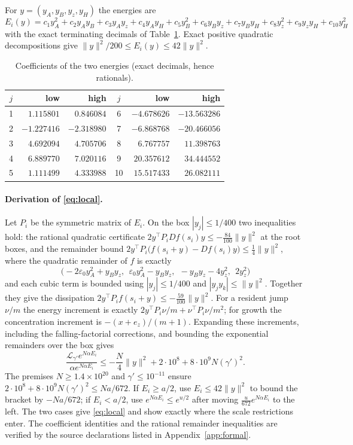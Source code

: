\documentclass[11pt,a4paper]{article}
\theoremstyle{plain}
\theoremstyle{definition}
\theoremstyle{remark}
\newcommand{\eps}{\varepsilon}
\newcommand{\Hs}{H}
\newcommand{\gen}{\mathcal L}
\begin{document}
For $y=(y_A,y_B,y_z,y_\Hs)$ the energies are
\[
E_i(y)=c_1y_A^2+c_2y_Ay_B+c_3y_Ay_z+c_4y_Ay_\Hs+c_5y_B^2+c_6y_By_z+c_7y_By_\Hs+c_8y_z^2+c_9y_zy_\Hs+c_{10}y_\Hs^2
\]
with the exact terminating decimals of Table~\ref{tab:coeff}. Exact positive quadratic decompositions give $\|y\|^2/200\le E_i(y)\le42\|y\|^2$.

\begin{table}[ht]
\centering\small
\caption{Coefficients of the two energies (exact decimals, hence rationals).}
\label{tab:coeff}
\begin{tabular}{crr@{\qquad}crr}
\toprule
$j$ & low & high & $j$ & low & high\\
\midrule
1 & $1.115801$ & $0.846084$ & 6 & $-4.678626$ & $-13.563286$\\
2 & $-1.227416$ & $-2.318980$ & 7 & $-6.868768$ & $-20.466056$\\
3 & $4.692094$ & $4.705706$ & 8 & $6.767757$ & $11.398763$\\
4 & $6.889770$ & $7.020116$ & 9 & $20.357612$ & $34.444552$\\
5 & $1.111499$ & $4.333988$ & 10 & $15.517433$ & $26.082111$\\
\bottomrule
\end{tabular}
\end{table}

\paragraph{Derivation of \eqref{eq:local}.}
Let $P_i$ be the symmetric matrix of $E_i$. On the box $|y_j|\le1/400$ two inequalities hold: the rational quadratic certificate $2y^{\!\top}P_iDf(s_i)y\le-\frac{84}{100}\|y\|^2$ at the root boxes, and the remainder bound $2y^{\!\top}P_i\bigl(f(s_i+y)-Df(s_i)y\bigr)\le\frac14\|y\|^2$, where the quadratic remainder of $f$ is exactly
\[
\bigl(-2\eps_0y_A^2+y_By_z,\ \ \eps_0y_A^2-y_By_z,\ \ -y_By_z-4y_z^2,\ \ 2y_z^2\bigr)
\]
and each cubic term is bounded using $|y_j|\le1/400$ and $|y_jy_k|\le\|y\|^2$. Together they give the dissipation $2y^{\!\top}P_if(s_i+y)\le-\frac{59}{100}\|y\|^2$. For a resident jump $\nu/m$ the energy increment is exactly $2y^{\!\top}P_i\nu/m+\nu^{\!\top}P_i\nu/m^2$; for growth the concentration increment is $-(x+e_z)/(m+1)$. Expanding these increments, including the falling-factorial corrections, and bounding the exponential remainders over the box gives
\[
\frac{\gen_{\gamma'}e^{N\alpha E_i}}{\alpha e^{N\alpha E_i}}\le-\frac N4\|y\|^2+2\cdot10^{8}+8\cdot10^{9}N(\gamma')^2 .
\]
The premises $N\ge1.4\times10^{20}$ and $\gamma'\le10^{-11}$ ensure $2\cdot10^{8}+8\cdot10^{9}N(\gamma')^2\le Na/672$. If $E_i\ge a/2$, use $E_i\le42\|y\|^2$ to bound the bracket by $-Na/672$; if $E_i<a/2$, use $e^{N\alpha E_i}\le e^{u/2}$ after moving $\frac u{672}e^{N\alpha E_i}$ to the left. The two cases give \eqref{eq:local} and show exactly where the scale restrictions enter. The coefficient identities and the rational remainder inequalities are verified by the source declarations listed in Appendix~\ref{app:formal}.
\end{document}
